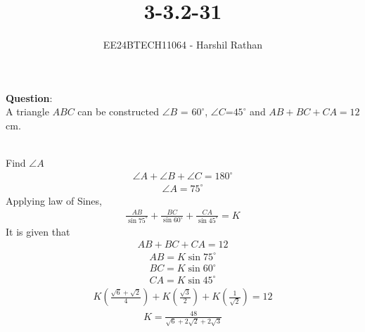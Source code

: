 \documentclass[journal]{IEEEtran}
\begin{document}

\vspace{3cm}

\title{3-3.2-31}
\author{EE24BTECH11064 - Harshil Rathan}
{\let\newpage\relax\maketitle}

\renewcommand{\thefigure}{\theenumi}
\renewcommand{\thetable}{\theenumi}
\setlength{\intextsep}{10pt} %


\renewcommand{\thetable}{\theenumi}
\textbf{Question}:\\
A triangle $ABC$ can be constructed $\angle{B}$ = $60^\circ$, $\angle{C}$=$45^\circ$ and $AB+BC+CA=12$cm.
\\
\solution \\
\begin{table}[h!]
    \centering
    
\end{table}
Find $\angle{A}$
\begin{align}
     \angle{A}+\angle{B}+\angle{C}=180^\circ 
\end{align}    
\begin{align}    
     \angle{A}=75^\circ
\end{align}
Applying law of Sines,
\begin{align}
          \frac{AB}{\sin{75^\circ}} + \frac{BC}{\sin{60^\circ}}+\frac{CA}{\sin{45^\circ}}=K
\end{align}
It is given that 
\begin{align}
 AB+BC+CA=12
\end{align}
\begin{align}
    AB =K \sin{75^\circ} 
    \label{0.5}
\end{align}
\begin{align}
    BC =K \sin{60^\circ}
    \label{0.6}
\end{align}
\begin{align}
    CA =K \sin{45^\circ}
    \label{0.7}
\end{align}
\begin{align}
    K(\frac{\sqrt{6}+\sqrt{2}}{4})+K(\frac{\sqrt{3}}{2})+K(\frac{1}{\sqrt{2}})=12
\end{align}
\begin{align}
    K=\frac{48}{\sqrt{6}+2\sqrt{2}+2\sqrt{3}}
    \label{0.9}
\end{align}
\end{document}

